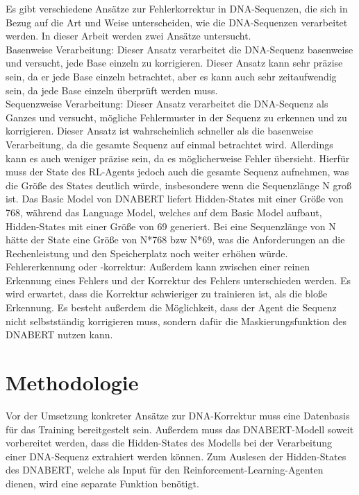 \documentclass[oneside,bibliography=totocnumbered,BCOR=5mm]{scrbook}%
\theoremstyle{definition}
\theoremstyle{definition}
\theoremstyle{definition}
\theoremstyle{definition}
\theoremstyle{definition}
\theoremstyle{definition}
\begin{document}
Es gibt verschiedene Ansätze zur Fehlerkorrektur in DNA-Sequenzen, 
die sich in Bezug auf die Art und Weise unterscheiden, wie die DNA-Sequenzen verarbeitet werden. 
In dieser Arbeit werden zwei Ansätze untersucht. \\


Basenweise Verarbeitung: Dieser Ansatz verarbeitet die DNA-Sequenz basenweise und versucht, 
jede Base einzeln zu korrigieren. 
Dieser Ansatz kann sehr präzise sein, da er jede Base einzeln betrachtet, 
aber es kann auch sehr zeitaufwendig sein, da jede Base einzeln überprüft werden muss. \\


Sequenzweise Verarbeitung: Dieser Ansatz verarbeitet die DNA-Sequenz als Ganzes und versucht, 
mögliche Fehlermuster in der Sequenz zu erkennen und zu korrigieren. 
Dieser Ansatz ist wahrscheinlich schneller als die basenweise Verarbeitung, 
da die gesamte Sequenz auf einmal betrachtet wird. 
Allerdings kann es auch weniger präzise sein, da es möglicherweise Fehler übersieht.
Hierfür muss der State des RL-Agents jedoch auch die gesamte Sequenz aufnehmen, 
was die Größe des States deutlich würde, insbesondere wenn die Sequenzlänge N groß ist. 
Das Basic Model von DNABERT liefert Hidden-States mit einer Größe von 768, 
während das Language Model, welches auf dem Basic Model aufbaut, Hidden-States mit einer Größe von 69 generiert. 
Bei eine Sequenzlänge von N hätte der State eine Größe von N*768 bzw N*69, 
was die Anforderungen an die Rechenleistung und den Speicherplatz noch weiter erhöhen würde. \\


Fehlererkennung oder -korrektur: Außerdem kann zwischen einer reinen Erkennung eines Fehlers und
der Korrektur des Fehlers unterschieden werden. Es wird erwartet, dass die Korrektur 
schwieriger zu trainieren ist, als die bloße Erkennung. Es besteht außerdem die Möglichkeit,
dass der Agent die Sequenz nicht selbstständig korrigieren muss, sondern dafür die Maskierungsfunktion
des DNABERT nutzen kann. \\
\linebreak[4]

\clearpage

\chapter{Methodologie}

Vor der Umsetzung konkreter Ansätze zur DNA-Korrektur muss eine Datenbasis 
für das Training bereitgestelt sein. Außerdem muss das DNABERT-Modell soweit vorbereitet werden,
dass die Hidden-States des Modells bei der Verarbeitung einer DNA-Sequenz extrahiert werden können.
Zum Auslesen der Hidden-States des DNABERT, welche als Input für den Reinforcement-Learning-Agenten dienen,
wird eine separate Funktion benötigt. \\
\end{document}

